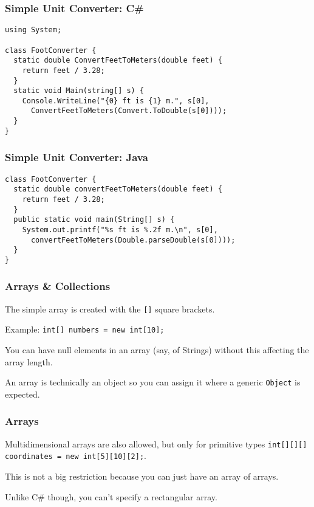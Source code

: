 \begin{frame}[fragile]
\frametitle{Simple Unit Converter: C\#}
\begin{changemargin}{1cm}

{\scriptsize
\begin{verbatim}
using System;

class FootConverter {
  static double ConvertFeetToMeters(double feet) {
    return feet / 3.28;
  }
  static void Main(string[] s) {
    Console.WriteLine("{0} ft is {1} m.", s[0], 
      ConvertFeetToMeters(Convert.ToDouble(s[0])));
  }
}
\end{verbatim}
}

\end{changemargin}
\end{frame}

\begin{frame}[fragile]
\frametitle{Simple Unit Converter: Java}
\begin{changemargin}{1cm}

{\scriptsize
\begin{verbatim}
class FootConverter {
  static double convertFeetToMeters(double feet) {
    return feet / 3.28;
  }
  public static void main(String[] s) {
    System.out.printf("%s ft is %.2f m.\n", s[0],
      convertFeetToMeters(Double.parseDouble(s[0])));
  }
}
\end{verbatim}
}

\end{changemargin}
\end{frame}

\begin{frame}
\frametitle{Arrays \& Collections}
\begin{changemargin}{1cm}

The simple array is created with the \texttt{[]} square brackets. 

Example: \texttt{int[] numbers = new int[10];}

You can have null elements in an array (say, of Strings) without this affecting the array length. 

An array is technically an object so you can assign it where a generic \texttt{Object} is expected. 


\end{changemargin}
\end{frame}

\begin{frame}
\frametitle{Arrays}
\begin{changemargin}{1cm}

Multidimensional arrays are also allowed, but only for primitive types \texttt{int[][][] coordinates = new int[5][10][2];}.  

This is not a big restriction because you can just have an array of arrays. 

Unlike C\# though, you can't specify a rectangular array.

\end{changemargin}
\end{frame}

